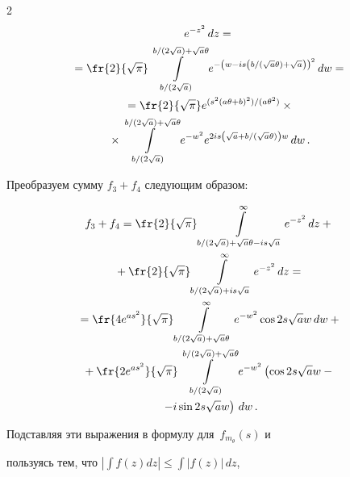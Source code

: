 \begin{multicols}{2}
\begin{multline*}
e^{-z^2}\,dz ={}\\


{}= \fr{2}{\sqrt{\pi}} \int\limits_{{b}/({2\sqrt{a}})}^{{b}/({2\sqrt{a}}) + 


\sqrt{a}\theta} e^{-\left(w - is\left({b}/({\sqrt{a}\theta}) + \sqrt{a}\right)\right)^2}\,dw ={}\\


{}


= \fr{2}{\sqrt{\pi}} e^{({s^2(a\theta + b)^2})/({a\theta^2})} \times{}\\


{}\times \int\limits_{{b}/({2\sqrt{a}})}^{{b}/({2\sqrt{a}}) + \sqrt{a}\theta}


e^{-w^2} e^{2is\left(\sqrt{a}+ {b}/({\sqrt{a}\theta})\right)w}\, dw\,.


\end{multline*}


Преобразуем сумму $f_3 + f_4$ следующим образом:





\noindent


\begin{multline*}


f_3 + f_4 = \fr{2}{\sqrt{\pi}}\int\limits_{{b}/({2\sqrt{a}}) + \sqrt{a}\theta - is\sqrt{a}}^{\infty}


e^{-z^2}\,dz +{}\\


{}+ \fr{2}{\sqrt{\pi}}\int\limits_{{b}/({2\sqrt{a}}) + is\sqrt{a}}^{\infty} e^{-z^2}\,dz ={}\\


{}=


 \fr{4e^{as^2}}{\sqrt{\pi}}\int\limits_{{b}/({2\sqrt{a}}) + \sqrt{a}\theta}^{\infty} 


 e^{-w^2} \cos 2s\sqrt{a} w\,dw +{}\\


 {}+


  \fr{2e^{as^2}}{\sqrt{\pi}}\int\limits_{{b}/({2\sqrt{a}})}^{{b}/({2\sqrt{a}}) + \sqrt{a}\theta} e^{-w^2} 


  \left(\cos 2s\sqrt{a} w -{}\right.\\


  {}\left. - i\sin 2s\sqrt{a} w\right)\,dw\,.


\end{multline*}


Подставляя эти выражения в формулу для~$f_{m_{\theta}}(s)$ и


пользуясь тем, что $\left|\int f(z)dz\right| \leq \int |f(z)|\,dz$,



\end{multicols}
